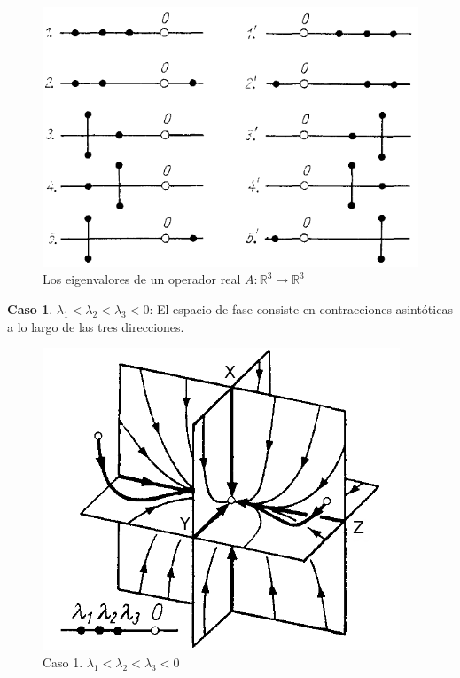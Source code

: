 \documentclass[a4paper,10pt]{article}
\numberwithin{equation}{section}
\begin{document}
\begin{figure}[h!]
 \centering
\includegraphics[scale=0.3]{problema3fig1}
\caption{Los eigenvalores de un operador real $A: \mathbb{R}^3 \rightarrow \mathbb{R}^3$}
\label{fig:problema3fig1}
\end{figure}

\newpage

\textbf{Caso 1}. $\lambda_1 < \lambda_2 < \lambda_3 < 0$: El espacio de fase consiste en contracciones asintóticas
a lo largo de las tres direcciones.

\begin{figure}[H]
 \centering
\includegraphics[scale=0.35]{problema3fig2}
\caption{Caso 1. $\lambda_1 < \lambda_2 < \lambda_3 < 0$}
\label{fig:problema3fig2}
\end{figure}
\vspace{.3cm}
\end{document}

